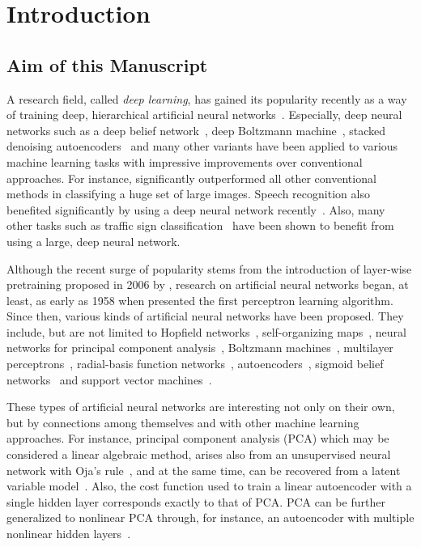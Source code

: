 \documentclass{now}
\begin{document}
\chapter{Introduction}


\section{Aim of this Manuscript}

A research field, called \textit{deep learning}, has gained its popularity
recently as a way of training deep, hierarchical artificial neural
networks~\citep[see, for example,][]{Bengio2009a}.  Especially, deep neural
networks such as a deep belief network~\citep{Hinton2006nc}, deep Boltzmann
machine~\citep{Salakhutdinov2009a}, stacked denoising
autoencoders~\citep{Vincent2010} and many other variants have been applied to
various machine learning tasks with impressive improvements over conventional
approaches.  For instance, \citet{Krizhevsky2012} significantly outperformed
all other conventional methods in classifying a huge set of large images.
Speech recognition also benefited significantly by using a deep neural network
recently~\citep[see, e.g.,][]{Hinton2012sp}. Also, many other tasks such as
traffic sign classification~\citep{Ciresan2012c} have been shown to benefit
from using a large, deep neural network.

Although the recent surge of popularity stems from the introduction of
layer-wise pretraining proposed in 2006 by
\citet{Hinton2006,Bengio2007nips,Ranzato2007}, research on artificial neural
networks began, at least, as early as 1958 when \citet{Rosenblatt1958} presented
the first perceptron learning algorithm. Since then, various kinds of artificial
neural networks have been proposed. They include, but are not limited to
Hopfield networks~\citep{Hopfield1982}, self-organizing
maps~\citep{Kohonen1982}, neural networks for principal component
analysis~\citep{Oja1982}, Boltzmann machines~\citep{Ackley1985}, multilayer
perceptrons~\citep{Rumelhart1986}, radial-basis function
networks~\citep{Broomhead1988}, autoencoders~\citep{Baldi1989}, sigmoid belief
networks~\citep{Neal1992} and support vector machines~\citep{Cortes1995}.

These types of artificial neural networks are interesting not only on their
own, but by connections among themselves and with other machine learning
approaches. For instance, principal component analysis
(PCA) which may be considered a
linear algebraic method, arises also from an unsupervised neural network with
Oja's rule~\citep{Oja1982}, and at the same time, can be recovered from a
latent variable model~\citep{Tipping1999,Roweis1998}.  Also, the cost function
used to train a linear autoencoder with a single hidden layer corresponds
exactly to that of PCA.  PCA can be further generalized to nonlinear PCA
through, for instance, an autoencoder with multiple nonlinear hidden
layers~\citep{Kramer1991,Oja1991}. 
\end{document}
